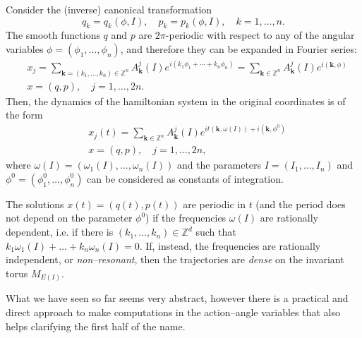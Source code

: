\documentclass[english,fontsize=11pt,paper=a5,oneside]{scrbook}
\newcommand{\Z}{\mathbb{Z}}
\theoremstyle{definition}
\newenvironment{remark}
  {\pushQED{\qed}\renewcommand{\qedsymbol}{$\lozenge$}\remarkx}
  {\popQED\endremarkx}
\begin{document}
\begin{remark}\label{rmk:nonresonant}
    Consider the (inverse) canonical transformation
    \begin{equation}
        q_k = q_k(\phi, I), \quad p_k = p_k(\phi, I), \quad k=1,\ldots,n.
    \end{equation}
    The smooth functions $q$ and $p$ are $2\pi$-periodic with respect to any of the angular variables $\phi = (\phi_1, \ldots, \phi_n)$, and therefore they can be expanded in Fourier series:
    \begin{align}
        &x_j = \sum_{\bm k = (k_1, \ldots, k_n)\in\Z^n} A^j_{\bm k}(I) e^{i(k_1 \phi_1 + \cdots + k_n \phi_n)} = \sum_{\bm k\in\Z^n} A^j_{\bm k}(I) e^{i(\bm k, \phi)} \\
        &x = (q,p), \quad j=1,\ldots,2n.
    \end{align}
    Then, the dynamics of the hamiltonian system in the original coordinates is of the form
    \begin{align}
        &x_j(t) = \sum_{\bm k\in\Z^n} A^j_{\bm k}(I) e^{i t(\bm k, \omega(I)) + i(\bm k,\phi^0)} \\
        &x = (q,p), \quad j=1,\ldots,2n,
    \end{align}
    where $\omega(I) = (\omega_1(I), \ldots, \omega_n(I))$ and the parameters $I = (I_1, \ldots, I_n)$ and $\phi^0 = (\phi_1^0, \ldots, \phi_n^0)$ can be considered as constants of integration.

    The solutions $x(t) = (q(t), p(t))$ are periodic in $t$ (and the period does not depend on the parameter $\phi^0$) if the frequencies $\omega(I)$ are rationally dependent, i.e. if there is $(k_1, \ldots, k_n)\in\Z^d$ such that $k_1\omega_1(I) + \ldots + k_n \omega_n(I) = 0$.
    If, instead, the frequencies are rationally independent, or \emph{non--resonant}, then the trajectories are \emph{dense} on the invariant torus $M_{E(I)}$.
\end{remark}

What we have seen so far seems very abstract, however there is a practical and direct approach to make computations in the action--angle variables that also helps clarifying the first half of the name.
\end{document}
